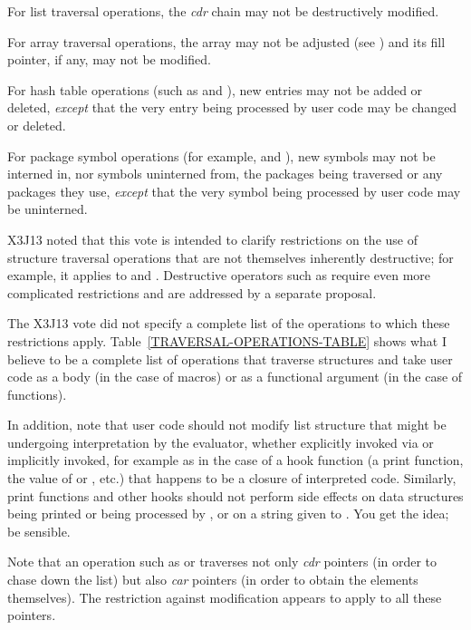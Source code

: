 For list traversal operations, the \emph{cdr} chain
may not be destructively modified.

For array traversal operations, the array may not be adjusted
(see ) and its fill pointer, if any, may not be modified.

For hash table operations (such as 
and ), new entries may not be added or deleted,
\emph{except} that the very entry being processed by user code
may be changed or deleted.

For package symbol operations (for example, 
and ), new symbols may not be interned in,
nor symbols uninterned from, the packages being traversed or
any packages they use, \emph{except} that the very symbol
being processed by user code may be uninterned.

X3J13 noted that this vote is intended to clarify restrictions
on the use of structure traversal operations that are not themselves
inherently destructive; for example, it applies to  and .
Destructive operators such as  require even more complicated
restrictions and are addressed by a separate proposal.

The X3J13 vote did not specify a complete list of the operations to which these
restrictions apply.  Table~\ref{TRAVERSAL-OPERATIONS-TABLE}
shows what I believe to be a complete list of operations
that traverse structures and take user code as a body (in the case of
macros) or as a functional argument (in the case of functions).

In addition, note that user code should not modify list
structure that might be undergoing interpretation by the evaluator,
whether explicitly invoked via  or implicitly invoked,
for example as in the case of a hook function (a 
print function, the value of  or , etc.)
that happens to be a closure of interpreted code.  Similarly, 
print functions and other hooks should not perform side effects
on data structures being printed or being processed by , or on a
string given to .  You get the idea;
be sensible.

Note that an operation such as  or  traverses
not only \emph{cdr} pointers (in order to chase down the list)
but also \emph{car} pointers (in order to obtain the elements themselves).
The restriction against modification appears to apply to all these pointers.

